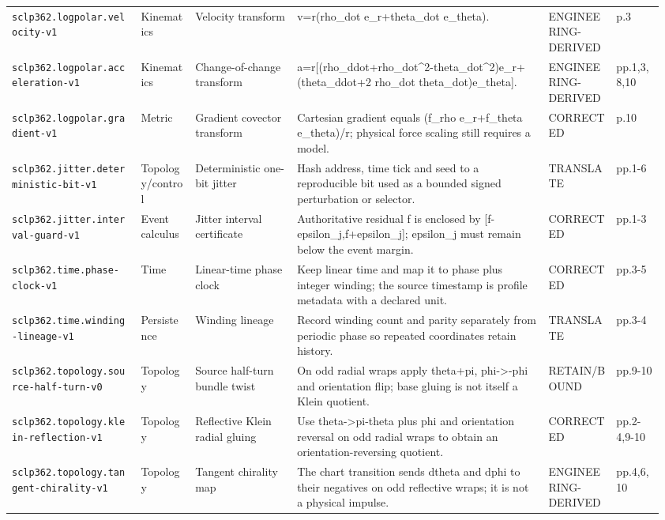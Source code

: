 \begin{landscape}
\begin{longtable}{p{0.19\linewidth} p{0.08\linewidth} p{0.15\linewidth} p{0.37\linewidth} p{0.10\linewidth} p{0.07\linewidth}}
\texttt{sclp362.logpolar.velocity-v1} & Kinematics & Velocity transform & v=r(rho\_dot e\_r+theta\_dot e\_theta). & ENGINEERING-DERIVED & p.3\\
\texttt{sclp362.logpolar.acceleration-v1} & Kinematics & Change-of-change transform & a=r[(rho\_ddot+rho\_dot\textasciicircum{}2-theta\_dot\textasciicircum{}2)e\_r+(theta\_ddot+2 rho\_dot theta\_dot)e\_theta]. & ENGINEERING-DERIVED & pp.1,3,8,10\\
\texttt{sclp362.logpolar.gradient-v1} & Metric & Gradient covector transform & Cartesian gradient equals (f\_rho e\_r+f\_theta e\_theta)/r; physical force scaling still requires a model. & CORRECTED & p.10\\
\texttt{sclp362.jitter.deterministic-bit-v1} & Topology/control & Deterministic one-bit jitter & Hash address, time tick and seed to a reproducible bit used as a bounded signed perturbation or selector. & TRANSLATE & pp.1-6\\
\texttt{sclp362.jitter.interval-guard-v1} & Event calculus & Jitter interval certificate & Authoritative residual f is enclosed by [f-epsilon\_j,f+epsilon\_j]; epsilon\_j must remain below the event margin. & CORRECTED & pp.1-3\\
\texttt{sclp362.time.phase-clock-v1} & Time & Linear-time phase clock & Keep linear time and map it to phase plus integer winding; the source timestamp is profile metadata with a declared unit. & CORRECTED & pp.3-5\\
\texttt{sclp362.time.winding-lineage-v1} & Persistence & Winding lineage & Record winding count and parity separately from periodic phase so repeated coordinates retain history. & TRANSLATE & pp.3-4\\
\texttt{sclp362.topology.source-half-turn-v0} & Topology & Source half-turn bundle twist & On odd radial wraps apply theta+pi, phi-\textgreater{}-phi and orientation flip; base gluing is not itself a Klein quotient. & RETAIN/BOUND & pp.9-10\\
\texttt{sclp362.topology.klein-reflection-v1} & Topology & Reflective Klein radial gluing & Use theta-\textgreater{}pi-theta plus phi and orientation reversal on odd radial wraps to obtain an orientation-reversing quotient. & CORRECTED & pp.2-4,9-10\\
\texttt{sclp362.topology.tangent-chirality-v1} & Topology & Tangent chirality map & The chart transition sends dtheta and dphi to their negatives on odd reflective wraps; it is not a physical impulse. & ENGINEERING-DERIVED & pp.4,6,10\\

\end{longtable}
\end{landscape}
